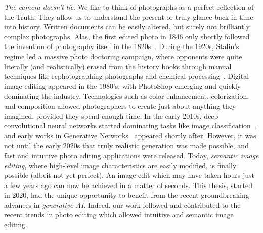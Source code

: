 \emph{The camera doesn't lie}. We like to think of photographs as a perfect 
reflection of the Truth. They allow us to understand the present or truly 
glance back in time into history. 
Written documents can be easily altered, but surely not brilliantly complex photographs. 
Alas, the first edited photo in 1846 only shortly followed 
 the invention of photography itself in the 1820s~\citep{imageediting}. 
 During the 1920s, Stalin's regime led a massive photo 
 doctoring campaign, where 
opponents were quite literally (and realistically) erased from the history
 books 
through manual techniques like 
rephotographing photographs and chemical processing~\citep{stalin}. Digital 
image 
editing appeared in the 1980's, with PhotoShop emerging and quickly dominating 
the industry. Technologies such as color enhancement, colorization, and composition 
allowed photographers to create just about anything they imagined, provided they 
spend enough time. 
In the early 2010s, deep convolutional neural networks started dominating tasks like image classification~\citep{krizhevsky2012alexnet},
and early works in Generative Networks~\citep{Kingma2014, goodfellowgans} appeared shortly after. However, it was not until 
the early 2020s that truly realistic generation was made possible, and fast and intuitive 
photo editing applications were released. Today, \emph{semantic image editing}, 
where high-level image characteristics are easily modified, is finally possible (albeit not 
yet perfect). An 
image edit which may have taken hours just a few years ago can now be achieved in a matter of seconds. 
This thesis, started in 2020, had the unique opportunity to benefit from 
the recent groundbreaking advances in \emph{generative AI}. Indeed, our work
 followed and contributed to the recent trends in 
photo editing which allowed intuitive and semantic image editing. 




